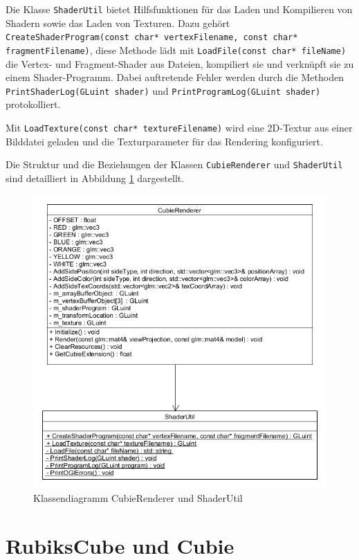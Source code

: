 Die Klasse \texttt{ShaderUtil} bietet Hilfsfunktionen für das Laden und Kompilieren von Shadern sowie das Laden von Texturen. Dazu gehört \texttt{CreateShaderProgram(const char* vertexFilename, const char* fragmentFilename)}, diese Methode lädt mit \texttt{LoadFile(const char* fileName)} die Vertex- und Fragment-Shader aus Dateien, kompiliert sie und verknüpft sie zu einem Shader-Programm. Dabei auftretende Fehler werden durch die Methoden \texttt{PrintShaderLog(GLuint shader)} und \texttt{PrintProgramLog(GLuint shader)} protokolliert. 

Mit \texttt{LoadTexture(const char* textureFilename)} wird eine 2D-Textur aus einer Bilddatei geladen und die Texturparameter für das Rendering konfiguriert.

Die Struktur und die Beziehungen der Klassen \texttt{CubieRenderer} und \texttt{ShaderUtil} sind detailliert in Abbildung \ref{CubieRendererDia} dargestellt.

\begin{figure} [H]
	\centering
	\includegraphics[scale=0.55]{images/CubieRendererClassDia.png}
	\caption{Klassendiagramm CubieRenderer und ShaderUtil}
	\label{CubieRendererDia}
\end{figure}

\section{RubiksCube und Cubie}
